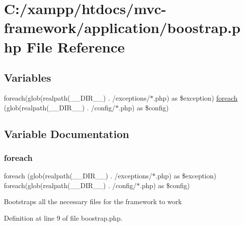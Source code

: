\hypertarget{boostrap_8php}{}\section{C\+:/xampp/htdocs/mvc-\/framework/application/boostrap.php File Reference}
\label{boostrap_8php}
\subsection*{Variables}
\begin{DoxyCompactItemize}
\item 
foreach(glob(realpath(\+\_\+\+\_\+\+D\+I\+R\+\_\+\+\_\+) . \textquotesingle{}/exceptions/$\ast$.php\textquotesingle{}) as \$exception) \hyperlink{boostrap_8php_a43c3747e487b786ca7ccb692c4504c72}{foreach} (glob(realpath(\+\_\+\+\_\+\+D\+I\+R\+\_\+\+\_\+) . \textquotesingle{}/config/$\ast$.php\textquotesingle{}) as \$config)
\end{DoxyCompactItemize}


\subsection{Variable Documentation}
\hypertarget{boostrap_8php_a43c3747e487b786ca7ccb692c4504c72}{}\label{boostrap_8php_a43c3747e487b786ca7ccb692c4504c72} 
\subsubsection{\texorpdfstring{foreach}{foreach}}
{\footnotesize\ttfamily foreach (glob(realpath(\+\_\+\+\_\+\+D\+I\+R\+\_\+\+\_\+) . \textquotesingle{}/exceptions/$\ast$.php\textquotesingle{}) as \$exception) foreach(glob(realpath(\+\_\+\+\_\+\+D\+I\+R\+\_\+\+\_\+) . \textquotesingle{}/config/$\ast$.php\textquotesingle{}) as \$config)}

Bootstraps all the necessary files for the framework to work 

Definition at line 9 of file boostrap.\+php.

